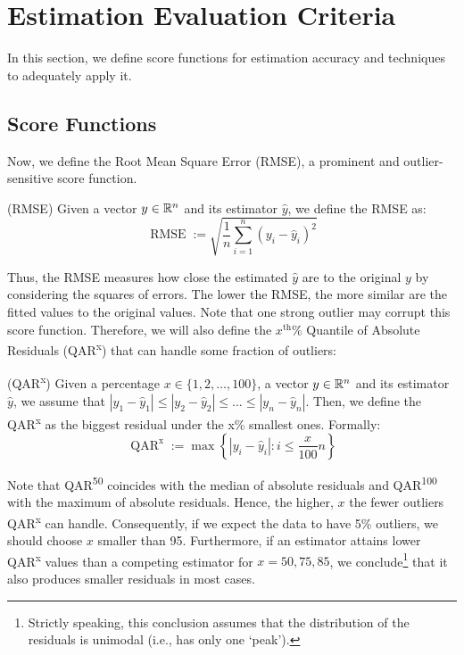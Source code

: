 \section{Estimation Evaluation Criteria}{ \label{sec:general_methods}
	In this section, we define score functions for estimation accuracy and techniques to adequately apply it. 

	\subsection{Score Functions}\label{sec:scorefun}
	    Now, we define the Root Mean Square Error (RMSE), a prominent and outlier-sensitive score function.
	    \begin{definition}(RMSE)\label{def:rmse}
		Given a vector $y\in \mathbb{R}^n$ and its estimator $\hat y$, we define the RMSE as:
		\begin{equation}
			\label{eq:rmse}
			 \operatorname{RMSE}:=\sqrt{\frac{1}{n}\sum_{i=1}^n (y_i - \hat y_i)^2}
		\end{equation}
		\end{definition}
		Thus, the RMSE measures how close the estimated $\hat y$ are to the original $y$ by considering the squares of errors. The lower the RMSE, the more similar are the fitted values to the original values. Note that one strong outlier may corrupt this score function. Therefore, we will also define the $x^\text{th}\%$ Quantile of Absolute Residuals (QAR\textsuperscript{x}) that can handle some fraction of outliers:
		\begin{definition} (QAR\textsuperscript{x}) \label{def:qar}
		    Given a percentage $x\in \{1,2,\dots,100\}$, a vector $y\in \mathbb{R}^n$ and its estimator $\hat y$, we assume that $|y_1-\hat y_1|\leq |y_2-\hat y_2|\leq \dots \leq |y_n-\hat y_n|$. Then, we define the QAR\textsuperscript{x} as the biggest residual under the x\% smallest ones. Formally:  
		    \begin{equation}
		        \operatorname{QAR}^{\text{x}}:=\max \left\{|y_i-\hat y_i|:i\leq \frac{x}{100}n \right\}
		    \end{equation}
		\end{definition}
		Note that QAR\textsuperscript{50} coincides with the median of absolute residuals and QAR\textsuperscript{100} with the maximum of absolute residuals. Hence, the higher, $x$ the fewer outliers QAR\textsuperscript{x} can handle. Consequently, if we expect the data to have 5\% outliers, we should choose $x$ smaller than 95. Furthermore, if an estimator attains lower QAR\textsuperscript{x} values than a competing estimator for $x=50,75,85$, we conclude\footnote{Strictly speaking, this conclusion assumes that the distribution of the residuals is unimodal (i.e., has only one `peak').} that it also produces smaller residuals in most cases.  
		
}
